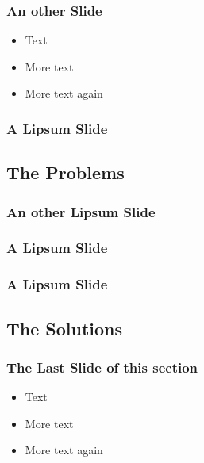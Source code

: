 \begin{frame} 
\frametitle{An other Slide}
  \begin{itemize}
  \item Text
  \item More text
  \item More text again
  \end{itemize}
\end{frame}


\begin{frame}
\frametitle{A Lipsum Slide}
  \lipsum[2]
\end{frame}

\subsection{The Problems}

\begin{frame}
\frametitle{An other Lipsum Slide}
  \lipsum[2]
\end{frame}


\begin{frame}
\frametitle{A Lipsum Slide}
  \lipsum[5]
\end{frame}


\begin{frame}
\frametitle{A Lipsum Slide}
  \lipsum[4]
\end{frame}

\subsection{The Solutions}

\begin{frame} 
\frametitle{The Last Slide of this section}
  \begin{itemize}
  \item Text
  \item More text
  \item More text again
  \end{itemize}
\end{frame}

